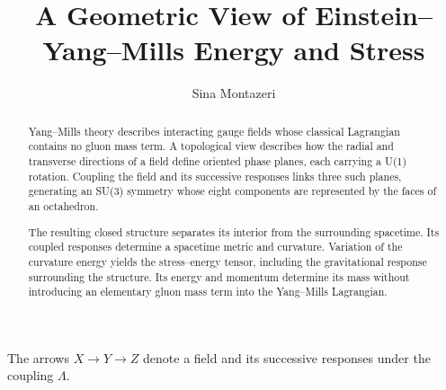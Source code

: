 \documentclass[11pt]{article}
\title{A Geometric View of Einstein--Yang--Mills Energy and Stress}
\author{Sina Montazeri}
\date{}
\theoremstyle{definition}
\begin{document}
\maketitle
\begin{abstract}
Yang--Mills theory describes interacting gauge fields whose classical Lagrangian contains no gluon mass term. A topological view describes how the radial and transverse directions of a field define oriented phase planes, each carrying a U(1) rotation. Coupling the field and its successive responses links three such planes, generating an SU(3) symmetry whose eight components are represented by the faces of an octahedron.

The resulting closed structure separates its interior from the surrounding spacetime. Its coupled responses determine a spacetime metric and curvature. Variation of the curvature energy yields the stress--energy tensor, including the gravitational response surrounding the structure. Its energy and momentum determine its mass without introducing an elementary gluon mass term into the Yang--Mills Lagrangian.
\end{abstract}
\par\begingroup\centering
{}\par
{}
{\small The arrows $X\to Y\to Z$ denote a field and its successive responses under the coupling $\Lambda$.\par}
\endgroup
\clearpage







\clearpage
\appendix

\clearpage

\clearpage

\clearpage


\end{document}

